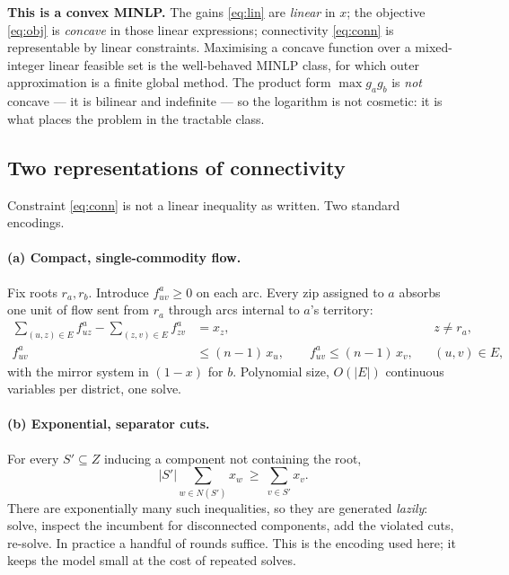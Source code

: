 \documentclass[11pt]{article}
\theoremstyle{remark}\newtheorem*{remark}{Remark}
\begin{document}
\begin{resultbox}
\textbf{This is a convex MINLP.} The gains \eqref{eq:lin} are \emph{linear} in $x$; the
objective \eqref{eq:obj} is \emph{concave} in those linear expressions; connectivity
\eqref{eq:conn} is representable by linear constraints. Maximising a concave function
over a mixed-integer linear feasible set is the well-behaved MINLP class, for which
outer approximation is a finite global method. The product form
$\max g_ag_b$ is \emph{not} concave --- it is bilinear and indefinite --- so the
logarithm is not cosmetic: it is what places the problem in the tractable class.
\end{resultbox}

\subsection{Two representations of connectivity}
Constraint \eqref{eq:conn} is not a linear inequality as written. Two standard encodings.

\paragraph{(a) Compact, single-commodity flow.} \citep{shirabe2005,shirabe2009} Fix
roots $r_a,r_b$. Introduce $f^a_{uv}\ge0$ on each arc. Every zip assigned to $a$ absorbs
one unit of flow sent from $r_a$ through arcs internal to $a$'s territory:
\begin{align}
\sum_{(u,z)\in E} f^a_{uz}-\sum_{(z,v)\in E} f^a_{zv} &= x_z, && z\ne r_a,\\
f^a_{uv} &\le (n-1)\,x_u, \qquad f^a_{uv}\le (n-1)\,x_v, && (u,v)\in E,
\end{align}
with the mirror system in $(1-x)$ for $b$. Polynomial size, $O(|E|)$ continuous
variables per district, one solve.

\paragraph{(b) Exponential, separator cuts.} For every $S'\subseteq Z$ inducing a
component not containing the root,
\begin{equation}\label{eq:cut2}
|S'|\sum_{w\in N(S')}x_w\ \ge\ \sum_{v\in S'}x_v .
\end{equation}
There are exponentially many such inequalities, so they are generated \emph{lazily}: solve,
inspect the incumbent for disconnected components, add the violated cuts, re-solve. In
practice a handful of rounds suffice. This is the encoding used here; it keeps the model
small at the cost of repeated solves.
\end{document}
